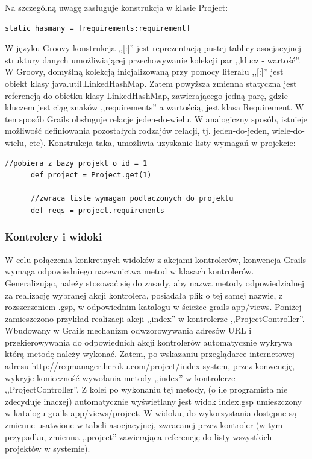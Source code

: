     Na szczególną uwagę zasługuje konstrukcja w klasie Project: 

    \begin{lstlisting}[caption={relacja jeden-do-wielu}, label={lst:oneToMany}]
      static hasmany = [requirements:requirement]
    \end{lstlisting}

    W języku Groovy konstrukcja ,,[:]'' jest reprezentacją pustej tablicy asocjacyjnej - struktury danych umożliwiającej przechowywanie kolekcji par ,,klucz - wartość''. W Groovy, domyślną kolekcją inicjalizowaną przy pomocy literału ,,[:]'' jest obiekt klasy java.util.LinkedHashMap. Zatem powyższa zmienna statyczna jest referencją do obietku klasy LinkedHashMap, zawierającego jedną parę, gdzie kluczem jest ciąg znaków ,,requirements'' a wartością, jest klasa Requirement. W ten sposób Grails obsługuje relacje jeden-do-wielu. W analogiczny sposób, istnieje możliwość definiowania pozostałych rodzajów relacji, tj. jeden-do-jeden, wiele-do-wielu, etc). Konstrukcja taka, umożliwia uzyskanie listy wymagań w projekcie: 

    \begin{lstlisting}[caption={wymagania przypisane do projektu}, label={lst:requirements}]
      //pobiera z bazy projekt o id = 1
      def project = Project.get(1)

      //zwraca liste wymagan podlaczonych do projektu
      def reqs = project.requirements 
    \end{lstlisting}
    
      
    \subsubsection{Kontrolery i widoki}

    W celu połączenia konkretnych widoków z akcjami kontrolerów, konwencja Grails wymaga odpowiedniego nazewnictwa metod w klasach kontrolerów. Generalizując, należy stosować się do zasady, aby nazwa metody odpowiedzialnej za realizację wybranej akcji kontrolera, posiadała plik o tej samej nazwie, z rozszerzeniem .gsp, w odpowiednim katalogu w ścieżce grails-app/views. Poniżej zamieszczono przykład realizacji akcji ,,index'' w kontrolerze ,,ProjectController''. Wbudowany w Grails mechanizm odwzorowywania adresów URL i przekierowywania do odpowiednich akcji kontrolerów automatycznie wykrywa którą metodę należy wykonać. Zatem, po wskazaniu przeglądarce internetowej adresu http://reqmanager.heroku.com/project/index system, przez konwencję, wykryje konieczność wywołania metody ,,index'' w kontrolerze ,,ProjectController''. Z kolei po wykonaniu tej metody, (o ile programista nie zdecyduje inaczej) automatycznie wyświetlany jest widok index.gsp umieszczony w katalogu grails-app/views/project. W widoku, do wykorzystania dostępne są zmienne usatwione w tabeli asocjacyjnej, zwracanej przez kontroler (w tym przypadku, zmienna ,,project'' zawierająca referencję do listy wszystkich projektów w systemie). 


